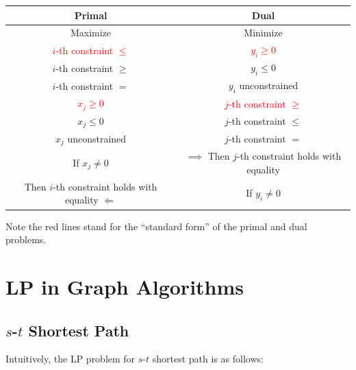\begin{center}
	\begin{tabular}{|c|c|}
		\hline
		Primal                                                  & Dual                                                  \\
		\hline
		Maximize                                                & Minimize                                              \\
		\textcolor{red}{$i$-th constraint $\le$}                & \textcolor{red}{$y_i\ge 0$}                           \\
		$i$-th constraint $\ge$                                 & $y_i\le 0$                                            \\
		$i$-th constraint $=$                                   & $y_i$ unconstrained                                   \\
		\textcolor{red}{$x_j\ge 0$}                             & \textcolor{red}{$j$-th constraint $\ge$}              \\
		$x_j\le 0$                                              & $j$-th constraint $\le$                               \\
		$x_j$ unconstrained                                     & $j$-th constraint $=$                                 \\
		\hline
		If $x_j \neq 0$                                         & $\implies$ Then $j$-th constraint holds with equality \\
		Then $i$-th constraint holds with equality $\Leftarrow$ & If $y_i \neq 0$                                       \\
		\hline
	\end{tabular}
\end{center}

Note the red lines stand for the ``standard form'' of the primal and dual problems.

\section{LP in Graph Algorithms}

\subsection{$s$-$t$ Shortest Path}

Intuitively, the LP problem for $s$-$t$ shortest path is as follows:

